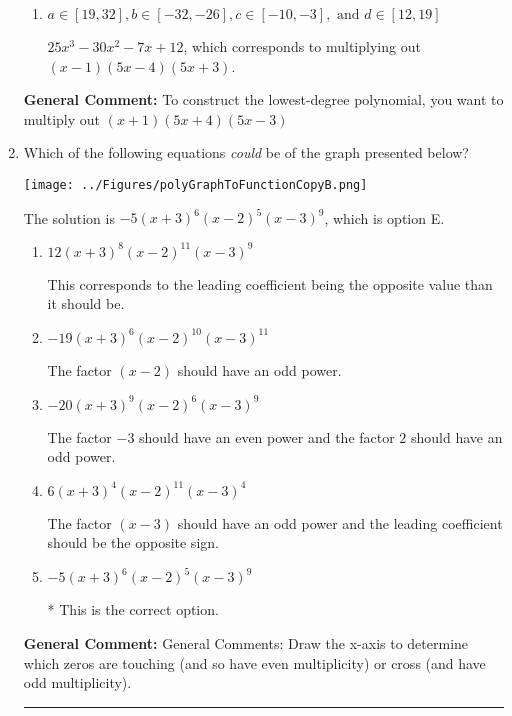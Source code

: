 \documentclass{extbook}[14pt]
\newcommand{\litem}[1]{\item #1

\rule{\textwidth}{0.4pt}}
\begin{document}
\begin{enumerate}
{\begin{enumerate}[label=\Alph*.]
* $25x^{3} +30 x^{2} -7 x -12$, which is the correct option.
\item \( a \in [19, 32], b \in [-32, -26], c \in [-10, -3], \text{ and } d \in [12, 19] \)

$25x^{3} -30 x^{2} -7 x + 12$, which corresponds to multiplying out $(x -1)(5x -4)(5x + 3)$.
\end{enumerate}

\textbf{General Comment:} To construct the lowest-degree polynomial, you want to multiply out $(x + 1)(5x + 4)(5x -3)$
}
\litem{
Which of the following equations \textit{could} be of the graph presented below?

\begin{center}
    \texttt{[image: ../Figures/polyGraphToFunctionCopyB.png]}
\end{center}


The solution is \( -5(x + 3)^{6} (x - 2)^{5} (x - 3)^{9} \), which is option E.\begin{enumerate}[label=\Alph*.]
\item \( 12(x + 3)^{8} (x - 2)^{11} (x - 3)^{9} \)

This corresponds to the leading coefficient being the opposite value than it should be.
\item \( -19(x + 3)^{6} (x - 2)^{10} (x - 3)^{11} \)

The factor $(x - 2)$ should have an odd power.
\item \( -20(x + 3)^{9} (x - 2)^{6} (x - 3)^{9} \)

The factor $-3$ should have an even power and the factor $2$ should have an odd power.
\item \( 6(x + 3)^{4} (x - 2)^{11} (x - 3)^{4} \)

The factor $(x - 3)$ should have an odd power and the leading coefficient should be the opposite sign.
\item \( -5(x + 3)^{6} (x - 2)^{5} (x - 3)^{9} \)

* This is the correct option.
\end{enumerate}

\textbf{General Comment:} General Comments: Draw the x-axis to determine which zeros are touching (and so have even multiplicity) or cross (and have odd multiplicity).
}
\end{enumerate}
\end{document}
